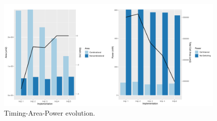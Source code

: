 \documentclass[journal,comsoc]{IEEEtran}
\begin{document}
\begin{figure}[ht!]
	\centering
	\includegraphics[width=0.85\linewidth]{Diagramas/areaTiempoPower.pdf}
	\caption{Timing-Area-Power evolution.}
	\label{fig:atp}
\end{figure}





\end{document}
